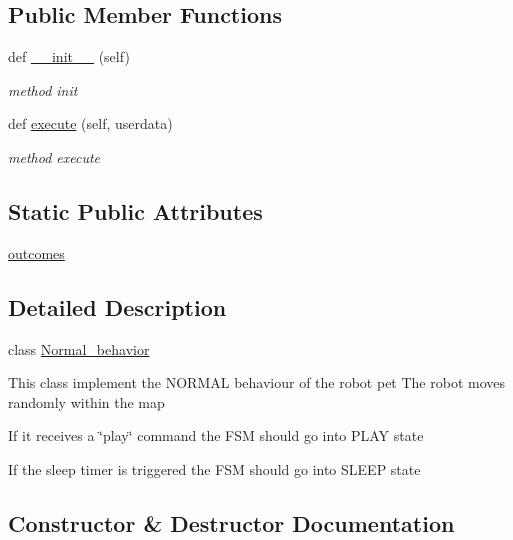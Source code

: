\subsection*{Public Member Functions}
\begin{DoxyCompactItemize}
\item 
def \hyperlink{classbehavior__manager_1_1Normal__behavior_a7ab22900e936fc3921a269389b51e6ab}{\+\_\+\+\_\+init\+\_\+\+\_\+} (self)
\begin{DoxyCompactList}\small\item\em method init \end{DoxyCompactList}\item 
def \hyperlink{classbehavior__manager_1_1Normal__behavior_a15faab6a43a39510355baad4faaa808a}{execute} (self, userdata)
\begin{DoxyCompactList}\small\item\em method execute \end{DoxyCompactList}\end{DoxyCompactItemize}
\subsection*{Static Public Attributes}
\begin{DoxyCompactItemize}
\item 
\hyperlink{classbehavior__manager_1_1Normal__behavior_a549e75cc34d356cff9b0915c99bf580a}{outcomes}
\end{DoxyCompactItemize}


\subsection{Detailed Description}
class \hyperlink{classbehavior__manager_1_1Normal__behavior}{Normal\+\_\+behavior} 

This class implement the N\+O\+R\+M\+AL behaviour of the robot pet The robot moves randomly within the map
\begin{DoxyItemize}
\item If it receives a \char`\"{}play\char`\"{} command the F\+SM should go into P\+L\+AY state
\item If the sleep timer is triggered the F\+SM should go into S\+L\+E\+EP state 
\end{DoxyItemize}

\subsection{Constructor \& Destructor Documentation}
